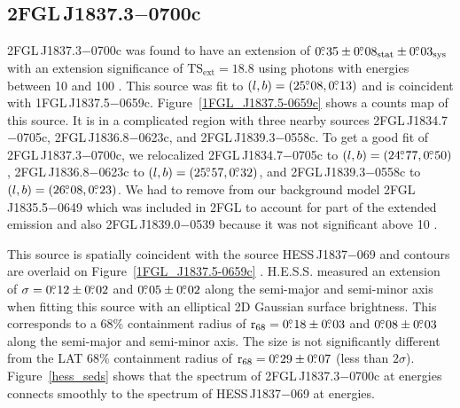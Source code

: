 \documentclass[12pt,preprint]{aastex}
\newcommand{\gev}{\text{GeV}\xspace}
\newcommand{\tev}{\text{TeV}\xspace}
\newcommand{\tsext}{{\ensuremath{\text{TS}_{\text{ext}}}}\xspace}
\newcommand{\rsixeight}{{\ensuremath{\text{r}_{68}}}\xspace}
\newcommand{\sys}{\text{sys}\xspace}
\newcommand{\stat}{\text{stat}\xspace}
\begin{document}
\subsection{2FGL\,J1837.3$-$0700c}
\label{section_2FGL_J1837.3-0700c}




2FGL\,J1837.3$-$0700c was found 
to
have an extension of $0\fdg35\pm0\fdg08_\stat\pm0\fdg03_\sys$ with an
extension significance of $\tsext=18.8$
using 
 photons with energies between
10 \gev and 100 \gev.  This source was fit to 
$(l,b)=(25\mbox{$.\!\!^\circ$}08,0\mbox{$.\!\!^\circ$}13)$ and is coincident with 
1FGL\,J1837.5$-$0659c.  Figure~\ref{1FGL_J1837.5-0659c}
shows a counts map of this source.
It is in a complicated region with three nearby
sources 2FGL\,J1834.7$-$0705c, 2FGL\,J1836.8$-$0623c, and
2FGL\,J1839.3$-$0558c.  To get a good fit of 2FGL\,J1837.3$-$0700c, we
relocalized 2FGL\,J1834.7$-$0705c to $(l,b)=(24\mbox{$.\!\!^\circ$}77,0\mbox{$.\!\!^\circ$}50)$,
2FGL\,J1836.8$-$0623c to $(l,b)=(25\mbox{$.\!\!^\circ$}57,0\mbox{$.\!\!^\circ$}32)$, and
2FGL\,J1839.3$-$0558c to $(l,b)=(26\mbox{$.\!\!^\circ$}08,0\mbox{$.\!\!^\circ$}23)$.  We had to remove from
our background model 
2FGL\,J1835.5$-$0649 which was included in 2FGL to account for
part of the extended emission 
and also 2FGL\,J1839.0$-$0539
because it was not significant above 10 \gev. 

This source is spatially coincident with the \tev source HESS\,J1837$-$069
and \tev contours are overlaid on 
Figure~\ref{1FGL_J1837.5-0659c} \citep{hess_plane_survey}.  
H.E.S.S. measured
an extension of $\sigma=0\mbox{$.\!\!^\circ$}12\pm0\mbox{$.\!\!^\circ$}02$ and $0\mbox{$.\!\!^\circ$}05\pm0\mbox{$.\!\!^\circ$}02$
along the semi-major and semi-minor axis when fitting this source
with an elliptical 2D Gaussian surface brightness.  This corresponds
to a 68\% containment radius of $\rsixeight=0\fdg18\pm0\fdg03$ and
$0\mbox{$.\!\!^\circ$}08\pm0\mbox{$.\!\!^\circ$}03$ along the semi-major and semi-minor axis. The
size is not significantly different from the LAT 68\% containment radius of
$\rsixeight=0\fdg29\pm0\fdg07$ (less than $2\sigma$).  
Figure~\ref{hess_seds} shows that the spectrum
of 2FGL\,J1837.3$-$0700c at \gev energies
connects smoothly to the spectrum of HESS\,J1837$-$069
at \tev energies.
\end{document}
